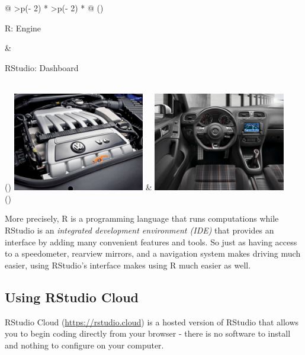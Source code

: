 \documentclass[
  letterpaper,
  DIV=11,
  numbers=noendperiod]{scrreprt}
\theoremstyle{definition}
\theoremstyle{remark}
\begin{document}
\begin{longtable}[]{@{}
  >{\centering\arraybackslash}p{(\columnwidth - 2\tabcolsep) * }
  >{\centering\arraybackslash}p{(\columnwidth - 2\tabcolsep) * }@{}}
\toprule()
\begin{minipage}[b]{\linewidth}\centering
R: Engine
\end{minipage} & \begin{minipage}[b]{\linewidth}\centering
RStudio: Dashboard
\end{minipage} \\
\midrule()
\endhead
\includegraphics[width=\textwidth,height=1.7in]{images/engine.jpg} &
\includegraphics[width=\textwidth,height=1.7in]{images/dashboard.jpg} \\
\bottomrule()
\end{longtable}

More precisely, R is a programming language that runs computations while
RStudio is an \emph{integrated development environment (IDE)} that
provides an interface by adding many convenient features and tools. So
just as having access to a speedometer, rearview mirrors, and a
navigation system makes driving much easier, using RStudio's interface
makes using R much easier as well.

\hypertarget{using-rstudio-cloud}{%
\subsection{Using RStudio Cloud}\label{using-rstudio-cloud}}

RStudio Cloud (\url{https://rstudio.cloud}) is a hosted version of
RStudio that allows you to begin coding directly from your browser -
there is no software to install and nothing to configure on your
computer.
\end{document}
